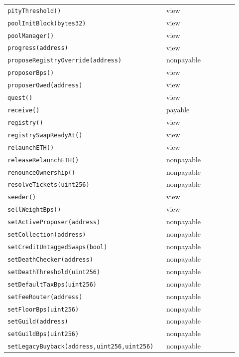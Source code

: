 \begin{longtable}{@{}p{0.62\linewidth}p{0.30\linewidth}@{}}
\texttt{\scriptsize pityThreshold()} & view \\
\texttt{\scriptsize poolInitBlock(bytes32)} & view \\
\texttt{\scriptsize poolManager()} & view \\
\texttt{\scriptsize progress(address)} & view \\
\texttt{\scriptsize proposeRegistryOverride(address)} & nonpayable \\
\texttt{\scriptsize proposerBps()} & view \\
\texttt{\scriptsize proposerOwed(address)} & view \\
\texttt{\scriptsize quest()} & view \\
\texttt{\scriptsize receive()} & payable \\
\texttt{\scriptsize registry()} & view \\
\texttt{\scriptsize registrySwapReadyAt()} & view \\
\texttt{\scriptsize relaunchETH()} & view \\
\texttt{\scriptsize releaseRelaunchETH()} & nonpayable \\
\texttt{\scriptsize renounceOwnership()} & nonpayable \\
\texttt{\scriptsize resolveTickets(uint256)} & nonpayable \\
\texttt{\scriptsize seeder()} & view \\
\texttt{\scriptsize sellWeightBps()} & view \\
\texttt{\scriptsize setActiveProposer(address)} & nonpayable \\
\texttt{\scriptsize setCollection(address)} & nonpayable \\
\texttt{\scriptsize setCreditUntaggedSwaps(bool)} & nonpayable \\
\texttt{\scriptsize setDeathChecker(address)} & nonpayable \\
\texttt{\scriptsize setDeathThreshold(uint256)} & nonpayable \\
\texttt{\scriptsize setDefaultTaxBps(uint256)} & nonpayable \\
\texttt{\scriptsize setFeeRouter(address)} & nonpayable \\
\texttt{\scriptsize setFloorBps(uint256)} & nonpayable \\
\texttt{\scriptsize setGuild(address)} & nonpayable \\
\texttt{\scriptsize setGuildBps(uint256)} & nonpayable \\
\texttt{\scriptsize setLegacyBuyback(address,uint256,uint256)} & nonpayable \\

\end{longtable}
